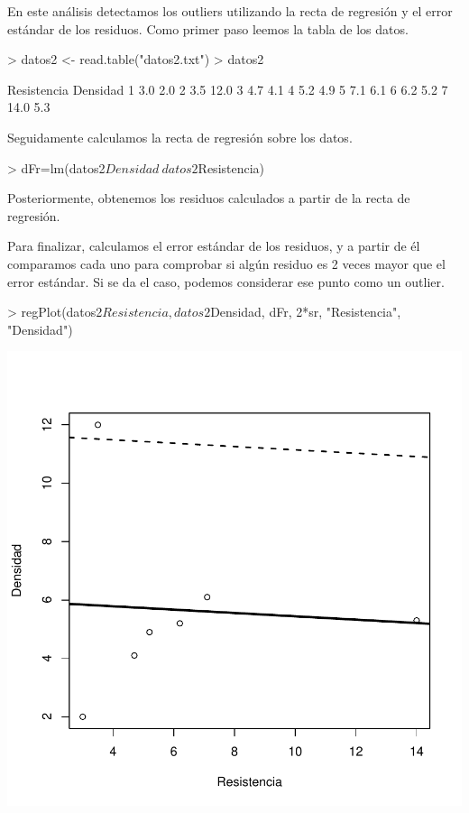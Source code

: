 \documentclass [a4paper] {article}
\begin{document}
En este análisis detectamos los outliers utilizando la recta de regresión y
el error estándar de los residuos. Como primer paso leemos la tabla de los datos.
\begin{Schunk}
\begin{Sinput}
> datos2 <- read.table("datos2.txt")
> datos2
\end{Sinput}
\begin{Soutput}
  Resistencia Densidad
1         3.0      2.0
2         3.5     12.0
3         4.7      4.1
4         5.2      4.9
5         7.1      6.1
6         6.2      5.2
7        14.0      5.3
\end{Soutput}
\end{Schunk}
Seguidamente calculamos la recta de regresión sobre los datos.
\begin{Schunk}
\begin{Sinput}
> dFr=lm(datos2$Densidad~datos2$Resistencia)
\end{Sinput}
\end{Schunk}
Posteriormente, obtenemos los residuos calculados a partir de la recta de regresión.
\begin{Schunk}
\end{Schunk}
Para finalizar, calculamos el error estándar de los residuos, y a partir de él comparamos cada
uno para comprobar si algún residuo es 2 veces mayor que el error estándar. Si se da el caso, 
podemos considerar ese punto como un outlier.
\begin{Schunk}
\begin{Sinput}
> regPlot(datos2$Resistencia, datos2$Densidad, dFr, 2*sr, "Resistencia", "Densidad")
\end{Sinput}
\end{Schunk}
\includegraphics{entrega-regresion_plot}
\end{document}

